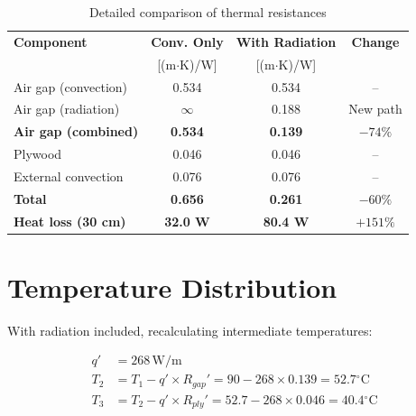 \documentclass[11pt]{article}
\newcommand{\degC}{$^\circ$C}
\newcommand{\unit}[1]{\,\mathrm{#1}}
\begin{document}
\begin{table}[H]
\centering
\caption{Detailed comparison of thermal resistances}
\begin{tabular}{lccc}
\toprule
\textbf{Component} & \textbf{Conv. Only} & \textbf{With Radiation} & \textbf{Change} \\
 & [(m$\cdot$K)/W] & [(m$\cdot$K)/W] & \\
\midrule
Air gap (convection) & 0.534 & 0.534 & -- \\
Air gap (radiation) & $\infty$ & 0.188 & New path \\
\textbf{Air gap (combined)} & \textbf{0.534} & \textbf{0.139} & $-74\%$ \\
Plywood & 0.046 & 0.046 & -- \\
External convection & 0.076 & 0.076 & -- \\
\midrule
\textbf{Total} & \textbf{0.656} & \textbf{0.261} & $-60\%$ \\
\midrule
\textbf{Heat loss (30 cm)} & \textbf{32.0 W} & \textbf{80.4 W} & $+151\%$ \\
\bottomrule
\end{tabular}
\end{table}

\section{Temperature Distribution}

With radiation included, recalculating intermediate temperatures:

\begin{align}
    q' &= 268\unit{W/m} \\
    T_2 &= T_1 - q' \times R_{gap}' = 90 - 268 \times 0.139 = \boxed{52.7\text{\degC}} \\
    T_3 &= T_2 - q' \times R_{ply}' = 52.7 - 268 \times 0.046 = \boxed{40.4\text{\degC}} \\
\end{align}
\end{document}
